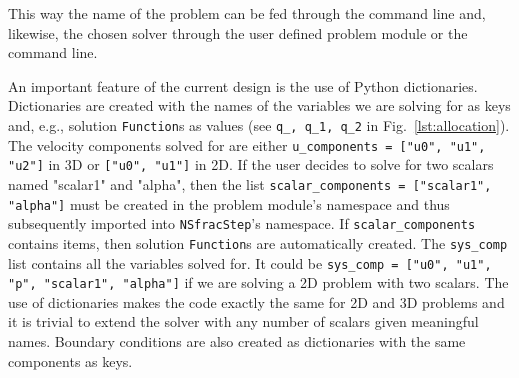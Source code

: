 \documentclass[final,3p,times,twocolumn]{elsarticle}
\newcommand{\inpyth}{\lstinline[style=inlinestyle]} %[]%
\begin{document}
\noindent This way the name of the problem can be fed through the command line and, likewise, the chosen solver through the user defined problem module or the command line.

An important feature of the current design is the use of Python dictionaries. Dictionaries are created with the names of the variables we are solving for as keys and, e.g., solution \inpyth{Function}s as values (see \inpyth{q_, q_1, q_2} in Fig.~\ref{lst:allocation}). The velocity components solved for are either \inpyth{u_components = ["u0", "u1", "u2"]} in 3D or \inpyth{["u0", "u1"]} in 2D. If the user decides to solve for two scalars named "scalar1" and "alpha", then the list \inpyth{scalar_components = ["scalar1", "alpha"]} must be created in the problem module's namespace and thus subsequently imported into \inpyth{NSfracStep}'s namespace. If \inpyth{scalar_components} contains items, then solution \inpyth{Function}s are automatically created. The \inpyth{sys_comp} list contains all the variables solved for. It could be \inpyth{sys_comp = ["u0", "u1", "p", "scalar1", "alpha"]} if we are solving a 2D problem with two scalars. The use of dictionaries makes the code exactly the same for 2D and 3D problems and it is trivial to extend the solver with any number of scalars given meaningful names. Boundary conditions are also created as dictionaries with the same components as keys.
\end{document}
